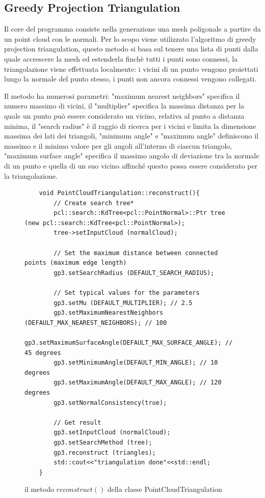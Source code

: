 \documentclass[a4paper,12pt]{article}
\begin{document}
	\subsection{Greedy Projection Triangulation}
	Il core del programma consiste nella generazione una mesh poligonale a partire da un point cloud con le normali.
	Per lo scopo viene utilizzato l'algoritmo di greedy projection triangulation, questo metodo si basa sul tenere una
	lista di punti dalla quale accrescere la mesh ed estenderla finchè tutti i punti sono connessi, la triangolazione
	viene effettuata localmente: i vicini di un punto vengono proiettati lungo la normale del punto stesso, i punti non
	ancora connessi vengono collegati. 
	
	Il metodo ha numerosi parametri: "maximum nearest neighbors" specifica il numero massimo di vicini,
	il "multiplier" specifica la massima distanza per la quale un punto può essere considerato un vicino, relativa al punto
	a distanza minima, il "search radius" è il raggio di ricerca per i vicini e limita la dimensione massima dei lati dei 
	triangoli, "minimum angle" e "maximum angle" definiscono il massimo e il minimo valore per gli angoli all'interno di 
	ciascun triangolo, "maximum surface angle" specifica il massimo angolo di deviazione tra la normale di un punto e quella di
	un suo vicino affinché questo possa essere considerato per la triangolazione.
	\begin{figure}[H]
	\begin{lstlisting}
	void PointCloudTriangulation::reconstruct(){
    	// Create search tree*
    	pcl::search::KdTree<pcl::PointNormal>::Ptr tree (new pcl::search::KdTree<pcl::PointNormal>);
    	tree->setInputCloud (normalCloud);
	
    	// Set the maximum distance between connected points (maximum edge length)
    	gp3.setSearchRadius (DEFAULT_SEARCH_RADIUS);
	
    	// Set typical values for the parameters
    	gp3.setMu (DEFAULT_MULTIPLIER); // 2.5
    	gp3.setMaximumNearestNeighbors (DEFAULT_MAX_NEAREST_NEIGHBORS); // 100
    	gp3.setMaximumSurfaceAngle(DEFAULT_MAX_SURFACE_ANGLE); // 45 degrees
	    gp3.setMinimumAngle(DEFAULT_MIN_ANGLE); // 10 degrees
    	gp3.setMaximumAngle(DEFAULT_MAX_ANGLE); // 120 degrees
    	gp3.setNormalConsistency(true);

    	// Get result
    	gp3.setInputCloud (normalCloud);
    	gp3.setSearchMethod (tree);
    	gp3.reconstruct (triangles);
    	std::cout<<"triangulation done"<<std::endl;
	}
	\end{lstlisting}
	\caption{il metodo $reconstruct()$ della classe PointCloudTriangulation}
	\label{reconstruct}
	\end{figure}
\end{document}
